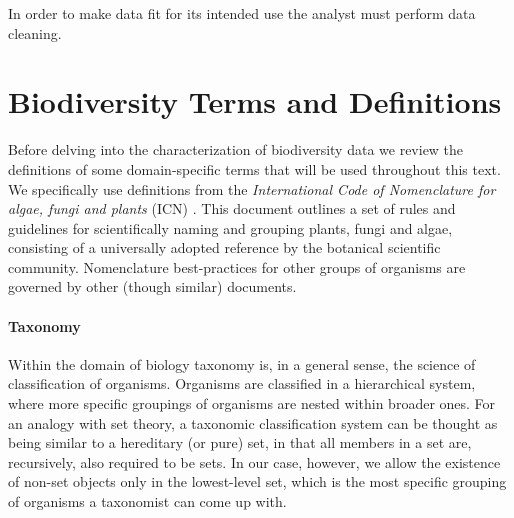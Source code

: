 
In order to make data fit for its intended use the analyst must perform data cleaning.










\section{Biodiversity Terms and Definitions} \label{section:biodiversity_terms}
Before delving into the characterization of biodiversity data we review the definitions of some domain-specific terms that will be used throughout this text. 
We specifically use definitions from the \textit{International Code of Nomenclature for algae, fungi and plants} (ICN) \cite{McNeill2012}. This document outlines a set of rules and guidelines for scientifically naming and grouping plants, fungi and algae, consisting of a universally adopted reference by the botanical scientific community. Nomenclature best-practices for other groups of organisms are governed by other (though similar) documents.

\paragraph*{Taxonomy}
Within the domain of biology taxonomy is, in a general sense, the science of classification of organisms. 
Organisms are classified in a hierarchical system, where more specific groupings of organisms are nested within broader ones. 
For an analogy with set theory, a taxonomic classification system can be thought as being similar to a hereditary (or pure) set, in that all members in a set are, recursively, also required to be sets. In our case, however, we allow the existence of non-set objects only in the lowest-level set, which is the most specific grouping of organisms a taxonomist can come up with.

